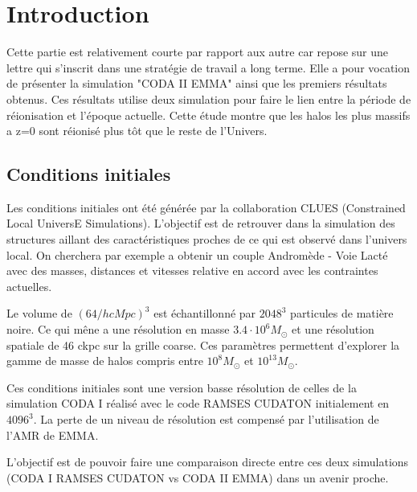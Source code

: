 \section{Introduction}

Cette partie est relativement courte par rapport aux autre car repose sur une lettre qui s'inscrit dans une stratégie de travail a long terme.
Elle a pour vocation de présenter la simulation "CODA II EMMA" ainsi que les premiers résultats obtenus.
Ces résultats utilise deux simulation pour faire le lien entre la période de réionisation et l’époque actuelle.
Cette étude montre que les halos les plus massifs a z=0 sont réionisé plus tôt que le reste de l'Univers.



\subsection{Conditions initiales}

Les conditions initiales ont été générée par la collaboration CLUES (Constrained Local UniversE Simulations).
L'objectif est de retrouver dans la simulation des structures aillant des caractéristiques proches de ce qui est observé dans l'univers local.
On cherchera par exemple a obtenir un couple Andromède - Voie Lacté avec des masses, distances et vitesses relative en accord avec les contraintes actuelles.


Le volume de $\left( 64/h cMpc \right) ^3$ est échantillonné par $2048^3$ particules de matière noire.
Ce qui mêne a une résolution en masse $3.4 \cdot 10^6 M_\odot$ et une résolution spatiale de 46 ckpc sur la grille coarse.
Ces paramètres permettent d'explorer la gamme de masse de halos compris entre $10^8 M_\odot$ et  $10^{13}M_\odot$.

Ces conditions initiales sont une version basse résolution de celles de la simulation CODA I%
réalisé avec le code RAMSES CUDATON %
initialement en $4096^3$.
La perte de un niveau de résolution est compensé par l'utilisation de l'AMR de EMMA.

L'objectif est de pouvoir faire une comparaison directe entre ces deux simulations (CODA I RAMSES CUDATON vs CODA II EMMA) dans un avenir proche.

